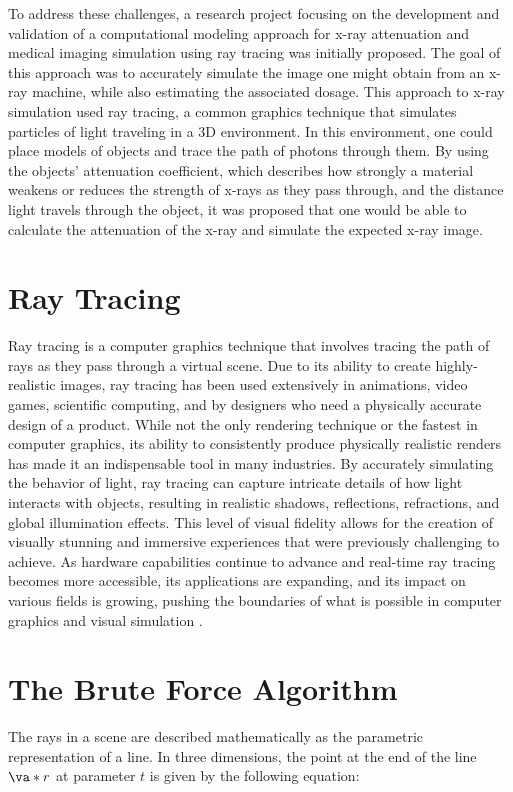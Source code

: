\par To address these challenges, a research project focusing on the development and validation of a computational modeling approach for x-ray attenuation and medical imaging simulation using ray tracing was initially proposed. The goal of this approach was to accurately simulate the image one might obtain from an x-ray machine, while also estimating the associated dosage. This approach to x-ray simulation used ray tracing, a common graphics technique that simulates particles of light traveling in a 3D environment. In this environment, one could place models of objects and trace the path of photons through them. By using the objects' attenuation coefficient, which describes how strongly a material weakens or reduces the strength of x-rays as they pass through, and the distance light travels through the object, it was proposed that one would be able to calculate the attenuation of the x-ray and simulate the expected x-ray image.

\section{Ray Tracing}
\par Ray tracing is a computer graphics technique that involves tracing the path of rays as they pass through a virtual scene. Due to its ability to create highly-realistic images, ray tracing has been used extensively in animations, video games, scientific computing, and by designers who need a physically accurate design of a product. While not the only rendering technique or the fastest in computer graphics, its ability to consistently produce physically realistic renders has made it an indispensable tool in many industries. By accurately simulating the behavior of light, ray tracing can capture intricate details of how light interacts with objects, resulting in realistic shadows, reflections, refractions, and global illumination effects. This level of visual fidelity allows for the creation of visually stunning and immersive experiences that were previously challenging to achieve. As hardware capabilities continue to advance and real-time ray tracing becomes more accessible, its applications are expanding, and its impact on various fields is growing, pushing the boundaries of what is possible in computer graphics and visual simulation \cite{Peddie}.

\section{The Brute Force Algorithm}
The rays in a scene are described mathematically as the parametric representation of a line. In three dimensions, the point at the end of the line $\va*{r}$ at parameter $t$ is given by the following equation:

